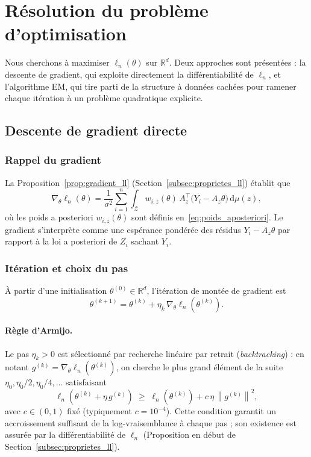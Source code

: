 \documentclass[12pt, a4paper]{article}
\theoremstyle{definition}
\newcommand{\R}{\mathbb{R}}
\newcommand{\Zcal}{\mathcal{Z}}
\newcommand{\norm}[1]{\left\|#1\right\|}
\begin{document}
% 
\newpage


\section{Résolution du problème d'optimisation}
\label{sec:optimisation}

Nous cherchons à maximiser $\ell_n(\theta)$ sur $\R^d$. Deux approches sont présentées : la descente de gradient, qui exploite directement la différentiabilité de $\ell_n$, et l'algorithme EM, qui tire parti de la structure à données cachées pour ramener chaque itération à un problème quadratique explicite.

\subsection{Descente de gradient directe}
\label{subsec:gradient}

\subsubsection{Rappel du gradient}

La Proposition~\ref{prop:gradient_ll} (Section~\ref{subsec:proprietes_ll}) établit que
\[
    \nabla_\theta \ell_n(\theta)
    = \frac{1}{\sigma^2}
      \sum_{i=1}^{n} \int_\Zcal w_{i,z}(\theta)\,
      A_z^\top\bigl(Y_i - A_z\theta\bigr)\,\mathrm{d}\mu(z),
\]
où les poids a posteriori $w_{i,z}(\theta)$ sont définis en~\eqref{eq:poids_aposteriori}. Le gradient s'interprète comme une espérance pondérée des résidus $Y_i - A_z\theta$ par rapport à la loi a posteriori de $Z_i$ sachant $Y_i$.

\subsubsection{Itération et choix du pas}

À partir d'une initialisation $\theta^{(0)} \in \R^d$, l'itération de montée de gradient est
\[
    \theta^{(k+1)} = \theta^{(k)} + \eta_k\, \nabla_\theta \ell_n\!\left(\theta^{(k)}\right).
\]

\paragraph{Règle d'Armijo.}
Le pas $\eta_k > 0$ est sélectionné par recherche linéaire par retrait (\emph{backtracking}) : en notant $g^{(k)} = \nabla_\theta \ell_n(\theta^{(k)})$, on cherche le plus grand élément de la suite $\eta_0, \eta_0/2, \eta_0/4, \ldots$ satisfaisant
\begin{equation}
    \ell_n\!\left(\theta^{(k)} + \eta\, g^{(k)}\right)
    \;\geq\;
    \ell_n\!\left(\theta^{(k)}\right) + c\,\eta\,\norm{g^{(k)}}^2,
    \label{eq:armijo}
\end{equation}
avec $c \in (0,1)$ fixé (typiquement $c = 10^{-4}$). Cette condition garantit un accroissement suffisant de la log-vraisemblance à chaque pas ; son existence est assurée par la différentiabilité de $\ell_n$ (Proposition en début de Section~\ref{subsec:proprietes_ll}).
\end{document}
